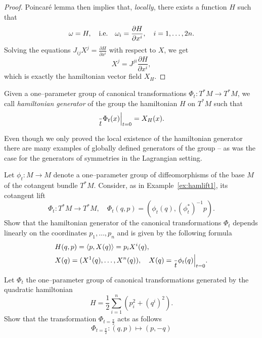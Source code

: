 \documentclass[english,fontsize=11pt,paper=a5,oneside]{scrbook}
\let\d\relax
\newcommand{\d}{\mathrm{d}}
\theoremstyle{definition}
\newenvironment{exercise}
  {\pushQED{\qed}\renewcommand{\qedsymbol}{$\maltese$}\exercisex}
  {\popQED\endexercisex}
\begin{document}
\begin{proof}
  Poincar\'e lemma \cite{book:lee} then implies that, \emph{locally}, there exists a function $H$ such that
  \begin{equation}
    \omega = \d H, \quad\mbox{i.e.}\quad \omega_i = \frac{\partial H}{\partial x^i}, \quad i=1,\ldots,2n.
  \end{equation}
  Solving the equations $J_{ij} X^j = \frac{\partial H}{\partial x^i}$ with respect to $X$, we get
  \begin{equation}
    X^j = J^{ji} \frac{\partial H}{\partial x^i},
  \end{equation}
  which is exactly the hamiltonian vector field $X_H$.
\end{proof}

\begin{tcolorbox}
  Given a one--parameter group of canonical transformations $\Phi_t:T^*M\to T^*M$, we call \emph{hamiltonian generator} of the group the hamiltonian $H$ on $T^*M$ such that
  \begin{equation}
    \frac{\d }{\d t}\Phi_t(x)\Big|_{t=0} = X_H(x).
  \end{equation}
\end{tcolorbox}

Even though we only proved the local existence of the hamiltonian generator there are many examples of globally defined generators of the group -- as was the case for the generators of symmetries in the Lagrangian setting.

\begin{exercise}
  Let $\phi_t:M\to M$ denote a one--parameter group of diffeomorphisms of the base  $M$ of the cotangent bundle $T^*M$.
  Consider, as in Example~\ref{ex:hamlift1}, its cotangent lift
  \begin{equation}
    \Phi_t:T^*M\to T^*M, \quad \Phi_t(q,p) = \left(\phi_t(q), \left(\phi_t^*\right)^{-1}p\right).
  \end{equation}
  Show that the hamiltonian generator of the canonical transformations $\Phi_t$ depends linearly on the coordinates $p_1, \ldots, p_n$ and is given by the following formula
  \begin{align}
     & H(q,p) = \langle p, X(q) \rangle = p_i X^i(q), \label{eq:linhamp}                   \\
     & X(q) = (X^1(q), \ldots, X^n(q)), \quad X(q) = \frac{\d}{\d t} \phi_t(q)\Big|_{t=0}.
  \end{align}
\end{exercise}

\begin{exercise}
  Let $\Phi_t$ the one--parameter group of canonical transformations generated by the quadratic hamiltonian
  \begin{equation}
    H = \frac12 \sum_{i=1}^n\left(p_i^2 + (q^i)^2\right).
  \end{equation}
  Show that the transformation $\Phi_{t=\frac\pi2}$ acts as follows
  \begin{equation}
    \Phi_{t=\frac\pi2} : (q,p) \mapsto (p, -q)
  \end{equation}
\end{exercise}
\end{document}
